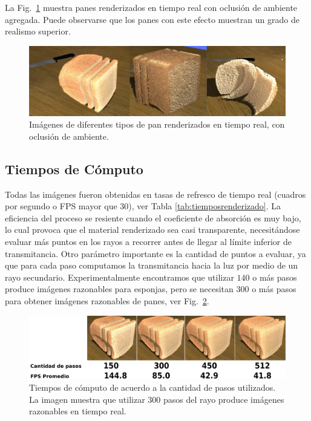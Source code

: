 La Fig.~\ref{fg:breads} muestra panes renderizados en tiempo real con oclusión de ambiente agregada.
Puede observarse que los panes con este efecto muestran un grado de realismo superior.

\begin{figure}[htb!]
  \centerline{\includegraphics[width=13cm]{breads}}
  \caption{Imágenes de diferentes tipos de pan renderizados en tiempo real, con oclusión de ambiente.}
  \label{fg:breads}
\end{figure}



\subsection*{Tiempos de Cómputo}

Todas las imágenes fueron obtenidas en tasas de refresco de tiempo real (cuadros por segundo o \acrshort{FPS} mayor que $30$), ver Tabla \ref{tab:tiemposrenderizado}.
La eficiencia del proceso se resiente cuando el coeficiente de absorción es muy bajo, lo cual provoca que el material renderizado sea casi transparente, necesitándose evaluar más puntos en los rayos a recorrer antes de llegar al límite inferior de transmitancia.
Otro parámetro importante es la cantidad de puntos a evaluar, ya que para cada paso computamos la transmitancia hacia la luz por medio de un rayo secundario.
Experimentalmente encontramos que utilizar $140$ o más pasos produce imágenes razonables para esponjas, pero se necesitan $300$ o más pasos para obtener imágenes razonables de panes, ver Fig.~\ref{fg:stepcount}.


\begin{figure}
  \centerline{\includegraphics[width=13cm]{figures/stepcount}}
  \caption[Tiempos de cómputo de acuerdo a la cantidad de pasos utilizados]{Tiempos de cómputo de acuerdo a la cantidad de pasos utilizados. La imagen muestra que utilizar $300$ pasos del rayo produce imágenes razonables en tiempo real.}
  \label{fg:stepcount}
\end{figure}

